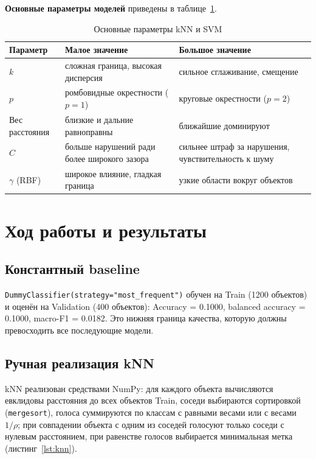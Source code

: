 \documentclass[14pt,a4paper]{extarticle}
\begin{document}
\textbf{Основные параметры моделей} приведены в таблице~\ref{tab:params}.

\begin{table}[h!]
\centering
\begin{tabular}{p{3.6cm}p{5.2cm}p{5.2cm}}
\toprule
Параметр & Малое значение & Большое значение \\
\midrule
$k$ & сложная граница, высокая дисперсия & сильное сглаживание, смещение \\
$p$ & ромбовидные окрестности ($p=1$) & круговые окрестности ($p=2$) \\
Вес расстояния & близкие и дальние равноправны & ближайшие доминируют \\
$C$ & больше нарушений ради более широкого зазора & сильнее штраф за нарушения, чувствительность к шуму \\
$\gamma$ (RBF) & широкое влияние, гладкая граница & узкие области вокруг объектов \\
\bottomrule
\end{tabular}
\caption{Основные параметры kNN и SVM}
\label{tab:params}
\end{table}

\section{Ход работы и результаты}

\subsection{Константный baseline}

\texttt{DummyClassifier(strategy="most\_frequent")} обучен на Train (1200 объектов) и оценён на Validation (400 объектов): Accuracy = 0.1000, balanced accuracy = 0.1000, macro-F1 = 0.0182. Это нижняя граница качества, которую должны превосходить все последующие модели.

\subsection{Ручная реализация kNN}

kNN реализован средствами NumPy: для каждого объекта вычисляются евклидовы расстояния до всех объектов Train, соседи выбираются сортировкой (\texttt{mergesort}), голоса суммируются по классам с равными весами или с весами $1/\rho$; при совпадении объекта с одним из соседей голосуют только соседи с нулевым расстоянием, при равенстве голосов выбирается минимальная метка (листинг~\ref{lst:knn}).
\end{document}
